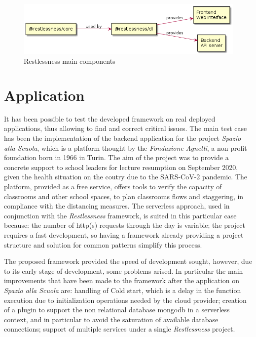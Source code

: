 \documentclass{article}
\begin{document}
\begin{figure}[h]
    \centering
    \includegraphics[width=12cm]{../source/diagrams/rln_components.png}
    \caption{Restlessness main components}
\end{figure}

\section{Application}
It has been possible to test the developed framework on real deployed applications,
thus allowing to find and correct critical issues. The main test case has been the
implementation of the backend application for the project \textit{Spazio alla Scuola},
which is a platform thought by the \textit{Fondazione Agnelli}, a non-profit
foundation born in 1966 in Turin.
The aim of the project was to provide a concrete support to school leaders for lecture
resumption on September 2020, given the health situation on the coutry due to the
SARS-CoV-2 pandemic. The platform, provided as a free service, offers tools to
verify the capacity of classrooms and other school spaces, to plan classrooms flows
and staggering, in compliance with the distancing measures.
The serverless approach, used in conjunction with the \textit{Restlessness} framework,
is suited in this particular case because: the number of http(s) requests through the
day is variable; the project requires a fast development, so having a framework
already providing a project structure and solution for common patterns simplify
this process.

\noindent
The proposed framework provided the speed of development sought, however, due to
its early stage of development, some problems arised.
In particular the main improvements that have been made to the framework after the
application on \textit{Spazio alla Scuola} are: handling of Cold start, which is
a delay in the function execution due to initialization operations needed by the
cloud provider; creation of a plugin to support the non relational database mongodb
in a serverless context, and in particular to avoid the saturation of available
database connections; support of multiple services under a single
\textit{Restlessness} project.
\end{document}
